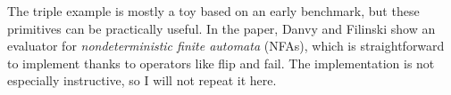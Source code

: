 \documentclass[acmsmall, nonacm, screen]{acmart}
\newcommand{\reset}[1]{\langle #1 \rangle}
\newcommand{\lambdaE}[2]{\lambda #1.\, #2}
\newcommand{\cps}[1]{\mathcal{C}\llbracket #1 \rrbracket}
\begin{document}
The \textsf{triple} example is mostly a toy based on an early benchmark, but these primitives can
be practically useful. In the paper, Danvy and Filinski show an evaluator for {\em
nondeterministic finite automata} (NFAs), which is straightforward to implement thanks to
operators like \textsf{flip} and \textsf{fail}. The implementation is not especially instructive,
so I will not repeat it here.



\end{document}
